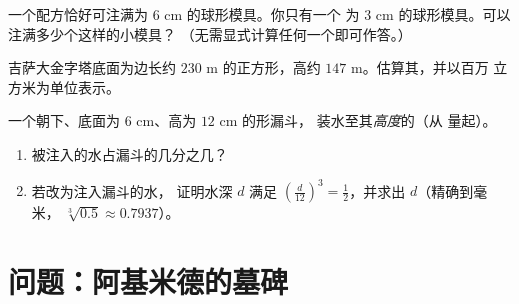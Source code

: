 \begin{exercise}[$\star\star$]\label{exo:g9:solids:7}
一个配方恰好可注满为 $6$ cm 的球形模具。你只有一个
为 $3$ cm 的球形模具。可以注满多少个这样的小模具？
（无需显式计算任何一个即可作答。）
\end{exercise}

\begin{exercise}[$\star\star$]\label{exo:g9:solids:8}
吉萨大金字塔底面为边长约 $230$ m 的正方形，高约
$147$ m。估算其，并以百万
立方米为单位表示。
\end{exercise}

\begin{exercise}[$\star\star\star$]\label{exo:g9:solids:9}
一个朝下、底面为 $6$ cm、高为 $12$ cm 的形漏斗，
装水至其\emph{高度}的（从
量起）。
\begin{enumerate}
  \item 被注入的水占漏斗的几分之几？
  \item 若改为注入漏斗\emph{}的水，
        证明水深 $d$ 满足
        $\left(\frac{d}{12}\right)^3 = \frac12$，并求出 $d$（精确到毫米，
        $\sqrt[3]{0.5} \approx 0.7937$）。
\end{enumerate}
\end{exercise}

\section{问题：阿基米德的墓碑}

